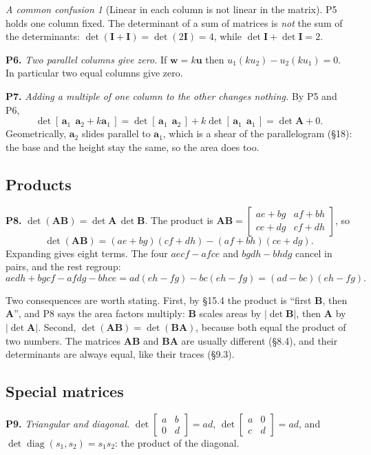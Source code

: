 \documentclass[11pt]{article}
\theoremstyle{plain}
\theoremstyle{definition}
\theoremstyle{remark}
\newtheorem*{warn}{A common confusion}
\newcommand{\vc}[1]{\mathbf{#1}}
\newcommand{\mt}[1]{\mathbf{#1}}
\DeclareMathOperator{\diagop}{diag}
\begin{document}
\begin{warn}[Linear in each column is not linear in the matrix]
P5 holds one column fixed. The determinant of a sum of matrices is \emph{not}
the sum of the determinants: $\det(\mt{I}+\mt{I})=\det(2\mt{I})=4$, while
$\det\mt{I}+\det\mt{I}=2$.
\end{warn}

\textbf{P6.} \emph{Two parallel columns give zero.} If $\vc{w}=k\vc{u}$ then
$u_1(ku_2)-u_2(ku_1)=0$. In particular two equal columns give zero.

\textbf{P7.} \emph{Adding a multiple of one column to the other changes
nothing.} By P5 and P6,
\[
  \det[\,\vc{a}_1\ \ \vc{a}_2+k\vc{a}_1\,]
  =\det[\,\vc{a}_1\ \ \vc{a}_2\,]+k\det[\,\vc{a}_1\ \ \vc{a}_1\,]
  =\det\mt{A}+0 .
\]
Geometrically, $\vc{a}_2$ slides parallel to $\vc{a}_1$, which is a shear of the
parallelogram (\S18): the base and the height stay the same, so the area does
too.

\subsection{Products}
\textbf{P8.} $\det(\mt{A}\mt{B})=\det\mt{A}\,\det\mt{B}$. The product is
$\mt{A}\mt{B}=\begin{bmatrix}ae+bg&af+bh\\ce+dg&cf+dh\end{bmatrix}$, so
\[
  \det(\mt{A}\mt{B})=(ae+bg)(cf+dh)-(af+bh)(ce+dg) .
\]
Expanding gives eight terms. The four $aecf-afce$ and $bgdh-bhdg$ cancel in
pairs, and the rest regroup:
\[
  aedh+bgcf-afdg-bhce
  =ad(eh-fg)-bc(eh-fg)
  =(ad-bc)(eh-fg) .
\]

\noindent Two consequences are worth stating. First, by \S15.4 the product is
``first $\mt{B}$, then $\mt{A}$'', and P8 says the area factors multiply: $\mt{B}$
scales areas by $|\det\mt{B}|$, then $\mt{A}$ by $|\det\mt{A}|$. Second,
$\det(\mt{A}\mt{B})=\det(\mt{B}\mt{A})$, because both equal the product of two
numbers. The matrices $\mt{A}\mt{B}$ and $\mt{B}\mt{A}$ are usually different
(\S8.4), and their determinants are always equal, like their traces (\S9.3).

\subsection{Special matrices}
\textbf{P9.} \emph{Triangular and diagonal.}
$\det\begin{bmatrix}a&b\\0&d\end{bmatrix}=ad$,
$\det\begin{bmatrix}a&0\\c&d\end{bmatrix}=ad$, and
$\det\diagop(s_1,s_2)=s_1s_2$: the product of the diagonal.
\end{document}
